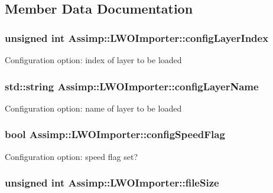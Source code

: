 \subsection{Member Data Documentation}
\hypertarget{class_assimp_1_1_l_w_o_importer_a510a869ff88dbb10101aeb11b87bc2e1}{
\subsubsection[{config\+Layer\+Index}]{\setlength{\rightskip}{0pt plus 5cm}unsigned int Assimp\+::\+L\+W\+O\+Importer\+::config\+Layer\+Index\hspace{0.3cm}{\ttfamily [protected]}}}\label{class_assimp_1_1_l_w_o_importer_a510a869ff88dbb10101aeb11b87bc2e1}
Configuration option\+: index of layer to be loaded \hypertarget{class_assimp_1_1_l_w_o_importer_a8f2789b53c2e96273ca1103be5bc1cf5}{
\subsubsection[{config\+Layer\+Name}]{\setlength{\rightskip}{0pt plus 5cm}std\+::string Assimp\+::\+L\+W\+O\+Importer\+::config\+Layer\+Name\hspace{0.3cm}{\ttfamily [protected]}}}\label{class_assimp_1_1_l_w_o_importer_a8f2789b53c2e96273ca1103be5bc1cf5}
Configuration option\+: name of layer to be loaded \hypertarget{class_assimp_1_1_l_w_o_importer_a5a0eb7f9f08aa4177621b6f297894e31}{
\subsubsection[{config\+Speed\+Flag}]{\setlength{\rightskip}{0pt plus 5cm}bool Assimp\+::\+L\+W\+O\+Importer\+::config\+Speed\+Flag\hspace{0.3cm}{\ttfamily [protected]}}}\label{class_assimp_1_1_l_w_o_importer_a5a0eb7f9f08aa4177621b6f297894e31}
Configuration option\+: speed flag set? \hypertarget{class_assimp_1_1_l_w_o_importer_af3cbffdb7546965aec708172204077ab}{
\subsubsection[{file\+Size}]{\setlength{\rightskip}{0pt plus 5cm}unsigned int Assimp\+::\+L\+W\+O\+Importer\+::file\+Size\hspace{0.3cm}{\ttfamily [protected]}}}\label{class_assimp_1_1_l_w_o_importer_af3cbffdb7546965aec708172204077ab}
